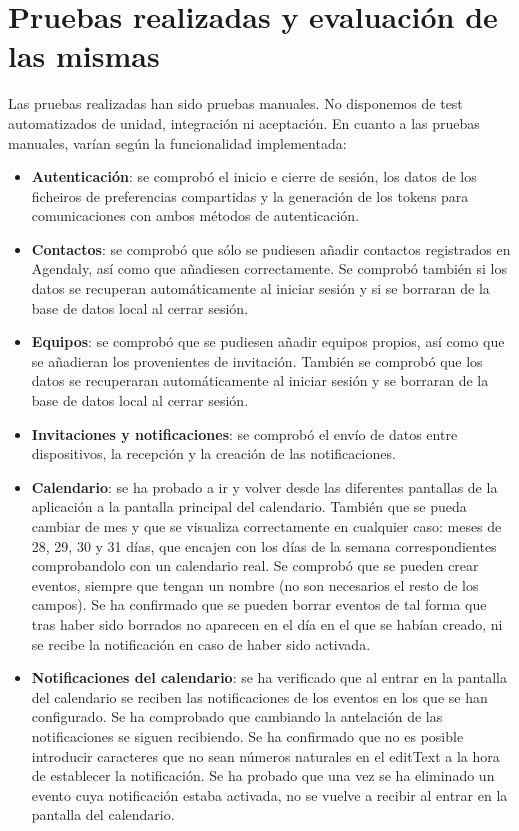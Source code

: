 \documentclass[a4paper,openright,12pt]{article}
\begin{document}
\section{Pruebas realizadas y evaluación de las mismas}
Las pruebas realizadas han sido pruebas manuales. No disponemos de test automatizados de unidad, integración ni aceptación.
\newline
En cuanto a las pruebas manuales, varían según la funcionalidad implementada:
\begin{itemize}
    \item \textbf{Autenticación}: se comprobó el inicio e cierre de sesión, los datos de los ficheiros de preferencias compartidas y la generación de los tokens para comunicaciones con ambos métodos de autenticación.
    \item \textbf{Contactos}: se comprobó que sólo se pudiesen añadir contactos registrados en Agendaly, así como que añadiesen correctamente. Se comprobó también si los datos se recuperan automáticamente al iniciar sesión y si se borraran de la base de datos local al cerrar sesión.
    \item \textbf{Equipos}: se comprobó que se pudiesen añadir equipos propios, así como que se añadieran los provenientes de invitación. También se comprobó que los datos se recuperaran automáticamente al iniciar sesión y se borraran de la base de datos local al cerrar sesión.
    \item \textbf{Invitaciones y notificaciones}: se comprobó el envío de datos entre dispositivos, la recepción y la creación de las notificaciones.
    \item \textbf{Calendario}: se ha probado a ir y volver desde las diferentes pantallas de la aplicación a la pantalla principal del calendario. También que se pueda cambiar de mes y que se visualiza correctamente en cualquier caso: meses de 28, 29, 30 y 31 días, que encajen con los días de la semana correspondientes comprobandolo con un calendario real. Se comprobó que se pueden crear eventos, siempre que tengan un nombre (no son necesarios el resto de los campos). Se ha confirmado que se pueden borrar eventos de tal forma que tras haber sido borrados no aparecen en el día en el que se habían creado, ni se recibe la notificación en caso de haber sido activada.
    \item \textbf{Notificaciones del calendario}: se ha verificado que al entrar en la pantalla del calendario se reciben las notificaciones de los eventos en los que se han configurado. Se ha comprobado que cambiando la antelación de las notificaciones se siguen recibiendo. Se ha confirmado que no es posible introducir caracteres que no sean números naturales en el editText a la hora de establecer la notificación. Se ha probado que una vez se ha eliminado un evento cuya notificación estaba activada, no se vuelve a recibir al entrar en la pantalla del calendario.


\end{itemize}
\end{document}
